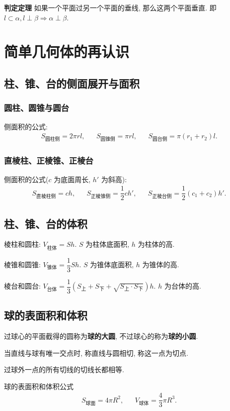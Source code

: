 \documentclass[titlepage]{ctexart}
\begin{document}
\textbf{判定定理} \quad 如果一个平面过另一个平面的垂线, 那么这两个平面垂直.
即 $l \subset \alpha, l \perp \beta \Rightarrow \alpha \perp \beta$.


\section{简单几何体的再认识}

\subsection{柱、锥、台的侧面展开与面积}

\subsubsection{圆柱、圆锥与圆台}

侧面积的公式: 
\begin{align*}
    S_{\text{圆柱侧}} = 2\pi rl, && S_{\text{圆锥侧}} = \pi rl, && S_{\text{圆台侧}} = \pi(r_1 + r_2)l.
\end{align*}

\subsubsection{直棱柱、正棱锥、正棱台}

侧面积的公式($c$ 为底面周长, $h'$ 为斜高):
\begin{align*}
    S_{\text{直棱柱侧}} = ch, && S_{\text{正棱锥侧}} = \dfrac{1}{2}ch', && S_{\text{正棱台侧}} = \dfrac{1}{2}(c_1 + c_2)h'.
\end{align*}

\subsection{柱、锥、台的体积}

棱柱和圆柱: $V_{\text{柱体}} = Sh$.
$S$ 为柱体底面积, $h$ 为柱体的高.

棱锥和圆锥: $V_{\text{锥体}} = \dfrac{1}{3}Sh$.
$S$ 为锥体底面积, $h$ 为锥体的高.

棱台和圆台: $V_{\text{台体}} = \dfrac{1}{3}(S_{\text{上}} + S_{\text{下}} + \sqrt{S_{\text{上}} \cdot S_{\text{下}}})h$.
$h$ 为台体的高.

\subsection{球的表面积和体积}

过球心的平面截得的圆称为\textbf{球的大圆}, 不过球心的称为\textbf{球的小圆}.

当直线与球有唯一交点时, 称直线与圆相切, 称这一点为切点.

过球外一点的所有切线的切线长都相等.

球的表面积和体积公式
\begin{align*}
    S_{\text{球面}} = 4\pi R^2, && V_{\text{球体}} = \dfrac{4}{3}\pi R^3.
\end{align*}
\end{document}
